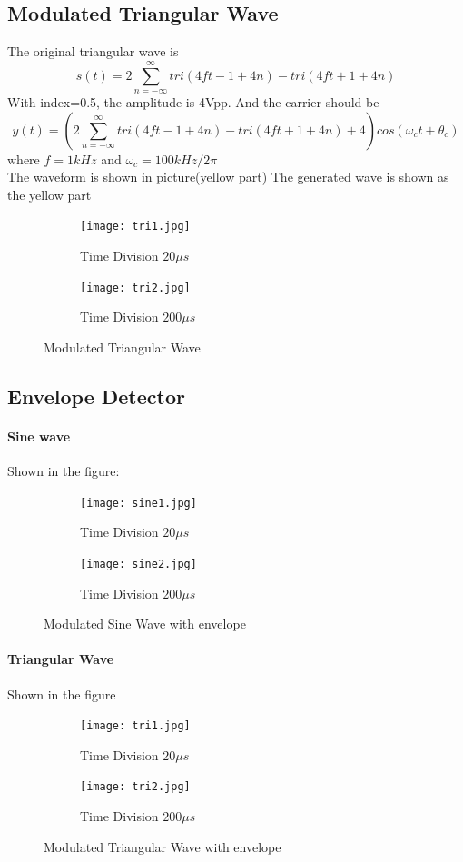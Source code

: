 \documentclass[a4paper]{article}
\begin{document}
    \subsection{Modulated Triangular Wave}
    The original triangular wave is 
    $$s(t)=2\sum_{n=-\infty}^\infty tri(4ft-1+4n)-tri(4ft+1+4n)$$
    With index=0.5, the amplitude is 4Vpp. And the carrier should be 
    $$y(t)=(2\sum_{n=-\infty}^\infty tri(4ft-1+4n)-tri(4ft+1+4n)+4)cos(\omega_ct+\theta_c)$$
    where $f=1kHz$ and $\omega_c=100kHz/2\pi$\\
    The waveform is shown in picture(yellow part)
    The generated wave is shown as the yellow part
    \begin{figure}[H]
        \centering
        \begin{subfigure}{0.4\textwidth}
            \texttt{[image: tri1.jpg]}
            \caption{Time Division $20\mu s$}
        \end{subfigure}
        \begin{subfigure}{0.4\textwidth}
            \texttt{[image: tri2.jpg]}
            \caption{Time Division $200\mu s$}
        \end{subfigure}
        \caption{Modulated Triangular Wave}
    \end{figure} 

    \subsection{Envelope Detector}
    \paragraph{Sine wave}
    Shown in the figure:
    \begin{figure}[H]
        \centering
        \begin{subfigure}{0.4\textwidth}
            \texttt{[image: sine1.jpg]}
            \caption{Time Division $20\mu s$}
        \end{subfigure}
        \begin{subfigure}{0.4\textwidth}
            \texttt{[image: sine2.jpg]}
            \caption{Time Division $200\mu s$}
        \end{subfigure}
        \caption{Modulated Sine Wave with envelope}
        \label{fig:sin1}
    \end{figure} 

    \paragraph{Triangular Wave} 
    Shown in the figure
    \begin{figure}[H]
        \centering
        \begin{subfigure}{0.4\textwidth}
            \texttt{[image: tri1.jpg]}
            \caption{Time Division $20\mu s$}
        \end{subfigure}
        \begin{subfigure}{0.4\textwidth}
            \texttt{[image: tri2.jpg]}
            \caption{Time Division $200\mu s$}
        \end{subfigure}
        \caption{Modulated Triangular Wave with envelope}
    \end{figure} 
\end{document}
